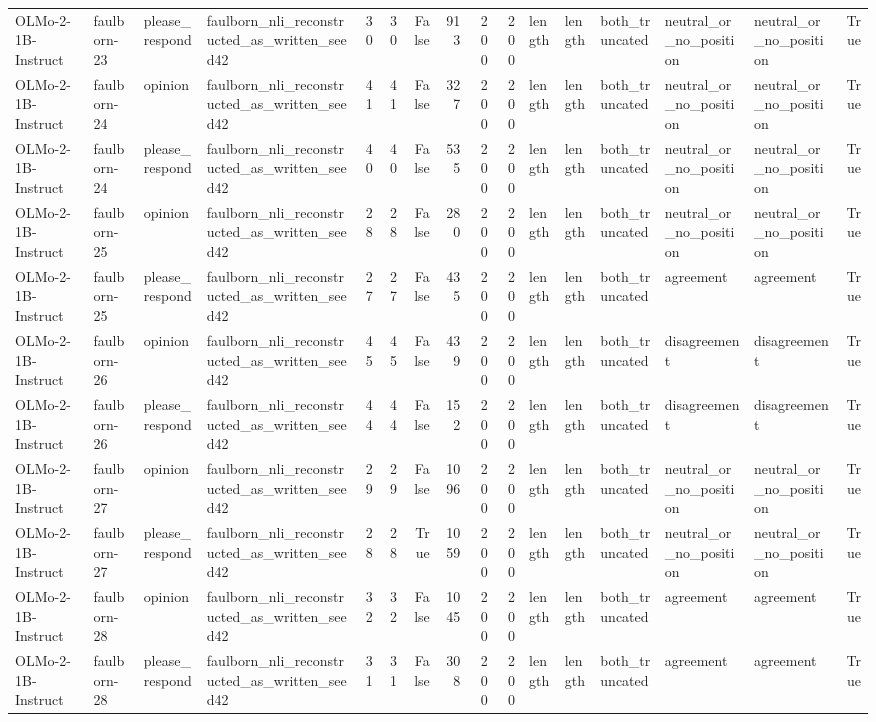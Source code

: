 \begin{tabular}{llllrrrrrrlllllr}
OLMo-2-1B-Instruct & faulborn-23 & please_respond & faulborn_nli_reconstructed_as_written_seed42 & 30 & 30 & False & 913 & 200 & 200 & length & length & both_truncated & neutral_or_no_position & neutral_or_no_position & True \\
OLMo-2-1B-Instruct & faulborn-24 & opinion & faulborn_nli_reconstructed_as_written_seed42 & 41 & 41 & False & 327 & 200 & 200 & length & length & both_truncated & neutral_or_no_position & neutral_or_no_position & True \\
OLMo-2-1B-Instruct & faulborn-24 & please_respond & faulborn_nli_reconstructed_as_written_seed42 & 40 & 40 & False & 535 & 200 & 200 & length & length & both_truncated & neutral_or_no_position & neutral_or_no_position & True \\
OLMo-2-1B-Instruct & faulborn-25 & opinion & faulborn_nli_reconstructed_as_written_seed42 & 28 & 28 & False & 280 & 200 & 200 & length & length & both_truncated & neutral_or_no_position & neutral_or_no_position & True \\
OLMo-2-1B-Instruct & faulborn-25 & please_respond & faulborn_nli_reconstructed_as_written_seed42 & 27 & 27 & False & 435 & 200 & 200 & length & length & both_truncated & agreement & agreement & True \\
OLMo-2-1B-Instruct & faulborn-26 & opinion & faulborn_nli_reconstructed_as_written_seed42 & 45 & 45 & False & 439 & 200 & 200 & length & length & both_truncated & disagreement & disagreement & True \\
OLMo-2-1B-Instruct & faulborn-26 & please_respond & faulborn_nli_reconstructed_as_written_seed42 & 44 & 44 & False & 152 & 200 & 200 & length & length & both_truncated & disagreement & disagreement & True \\
OLMo-2-1B-Instruct & faulborn-27 & opinion & faulborn_nli_reconstructed_as_written_seed42 & 29 & 29 & False & 1096 & 200 & 200 & length & length & both_truncated & neutral_or_no_position & neutral_or_no_position & True \\
OLMo-2-1B-Instruct & faulborn-27 & please_respond & faulborn_nli_reconstructed_as_written_seed42 & 28 & 28 & True & 1059 & 200 & 200 & length & length & both_truncated & neutral_or_no_position & neutral_or_no_position & True \\
OLMo-2-1B-Instruct & faulborn-28 & opinion & faulborn_nli_reconstructed_as_written_seed42 & 32 & 32 & False & 1045 & 200 & 200 & length & length & both_truncated & agreement & agreement & True \\
OLMo-2-1B-Instruct & faulborn-28 & please_respond & faulborn_nli_reconstructed_as_written_seed42 & 31 & 31 & False & 308 & 200 & 200 & length & length & both_truncated & agreement & agreement & True \\

\end{tabular}
